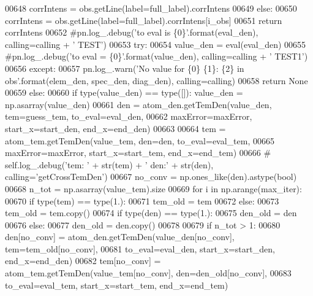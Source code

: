 \begin{DoxyCode}
{{{{{00648                     corrIntens = obs.getLine(label=full\_label).corrIntens
00649                 \textcolor{keywordflow}{else}:
00650                     corrIntens = obs.getLine(label=full\_label).corrIntens[i\_obs]
00651                 \textcolor{keywordflow}{return} corrIntens
00652             \textcolor{comment}{#pn.log\_.debug('to eval is \{0\}'.format(eval\_den), calling=calling + ' TEST')}
00653             \textcolor{keywordflow}{try}:
00654                 value\_den = eval(eval\_den)
00655                 \textcolor{comment}{#pn.log\_.debug('to eval = \{0\}'.format(value\_den), calling=calling + ' TEST1')}
00656             \textcolor{keywordflow}{except}:
00657                 pn.log\_.warn(\textcolor{stringliteral}{'No value for \{0\} \{1\}: \{2\} in obs'}.format(elem\_den, spec\_den, diag\_den), 
      calling=calling)
00658                 \textcolor{keywordflow}{return} \textcolor{keywordtype}{None}
00659         \textcolor{keywordflow}{else}:
00660             \textcolor{keywordflow}{if} type(value\_den) == type([]): value\_den = np.asarray(value\_den)
00661         den = atom\_den.getTemDen(value\_den, tem=guess\_tem, to\_eval=eval\_den,
00662                                  maxError=maxError, start\_x=start\_den, end\_x=end\_den)
00663         
00664         tem = atom\_tem.getTemDen(value\_tem, den=den, to\_eval=eval\_tem,
00665                                  maxError=maxError, start\_x=start\_tem, end\_x=end\_tem)
00666 \textcolor{comment}{#        self.log\_.debug('tem: ' + str(tem) + ' den:' + str(den), calling='getCrossTemDen')}
00667         no\_conv = np.ones\_like(den).astype(bool)
00668         n\_tot = np.asarray(value\_tem).size
00669         \textcolor{keywordflow}{for} i \textcolor{keywordflow}{in} np.arange(max\_iter):
00670             \textcolor{keywordflow}{if} type(tem) == type(1.):
00671                 tem\_old = tem
00672             \textcolor{keywordflow}{else}:
00673                 tem\_old = tem.copy()
00674             \textcolor{keywordflow}{if} type(den) == type(1.):
00675                 den\_old = den
00676             \textcolor{keywordflow}{else}:
00677                 den\_old = den.copy()
00678             
00679             \textcolor{keywordflow}{if} n\_tot > 1:
00680                 den[no\_conv] = atom\_den.getTemDen(value\_den[no\_conv], tem=tem\_old[no\_conv],
00681                                                   to\_eval=eval\_den, start\_x=start\_den, end\_x=end\_den)
00682                 tem[no\_conv] = atom\_tem.getTemDen(value\_tem[no\_conv], den=den\_old[no\_conv],
00683                                                   to\_eval=eval\_tem, start\_x=start\_tem, end\_x=end\_tem)
}}}}}
\end{DoxyCode}
